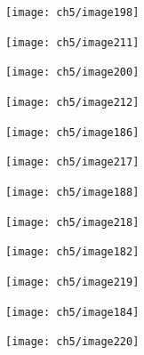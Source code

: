 \begin{figure}[H]
	\centering
	\begin{subfigure}[b]{0.45\textwidth}
		\texttt{[image: ch5/image198]}
	\end{subfigure}
	\begin{subfigure}[b]{0.45\textwidth}
		\texttt{[image: ch5/image211]}
	\end{subfigure}
\end{figure}

\begin{figure}[H]
	\centering
	\begin{subfigure}[b]{0.45\textwidth}
		\texttt{[image: ch5/image200]}
	\end{subfigure}
	\begin{subfigure}[b]{0.45\textwidth}
		\texttt{[image: ch5/image212]}
	\end{subfigure}
\end{figure}

\begin{figure}[H]
	\centering
	\begin{subfigure}[b]{0.45\textwidth}
		\texttt{[image: ch5/image186]}
	\end{subfigure}
	\begin{subfigure}[b]{0.45\textwidth}
		\texttt{[image: ch5/image217]}
	\end{subfigure}
\end{figure}

\begin{figure}[H]
	\centering
	\begin{subfigure}[b]{0.45\textwidth}
		\texttt{[image: ch5/image188]}
	\end{subfigure}
	\begin{subfigure}[b]{0.45\textwidth}
		\texttt{[image: ch5/image218]}
	\end{subfigure}
\end{figure}

\begin{figure}[H]
	\centering
	\begin{subfigure}[b]{0.45\textwidth}
		\texttt{[image: ch5/image182]}
	\end{subfigure}
	\begin{subfigure}[b]{0.45\textwidth}
		\texttt{[image: ch5/image219]}
	\end{subfigure}
\end{figure}

\begin{figure}[H]
	\centering
	\begin{subfigure}[b]{0.45\textwidth}
		\texttt{[image: ch5/image184]}
	\end{subfigure}
	\begin{subfigure}[b]{0.45\textwidth}
		\texttt{[image: ch5/image220]}
	\end{subfigure}
\end{figure}

